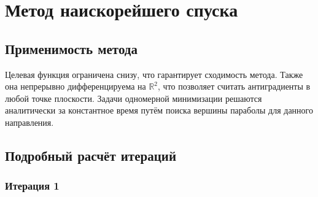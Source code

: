 \documentclass[12pt]{article}
\begin{document}
\newpage

\section{Метод наискорейшего спуска}

\subsection{Применимость метода}

Целевая функция ограничена снизу, что гарантирует сходимость метода. Также она непрерывно дифференцируема на \( \mathbb{R}^2 \), что позволяет считать антиградиенты в любой точке плоскости. Задачи одномерной минимизации решаются аналитически за константное время путём поиска вершины параболы для данного направления.

\subsection{Подробный расчёт итераций}
\subsubsection{Итерация 1}
\end{document}
